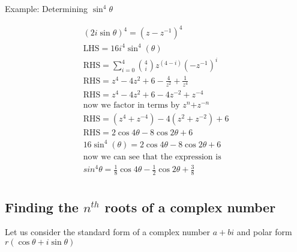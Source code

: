 Example: Determining $\sin^4{\theta}$

\begin{equation}
    \begin{split}
        (2i\sin{\theta})^4 = (z-z^{-1})^4 \\
        \text{LHS} = 16i^{4}\sin^4{(\theta)} \\         
        \text{RHS} = \sum _{i=0}^4\binom{4}{i}z^{\left(4-i\right)}\left(-z^{-1}\right)^i \\
        \text{RHS} = z^4-4z^2+6-\frac{4}{z^2}+\frac{1}{z^4} \\
        \text{RHS} = z^{4}-4z^{2}+6-4z^{-2}+z^{-4} \\
        \text{now we factor in terms by $z^n$+$z^{-n}$} \\ 
        \text{RHS} = (z^4+z^{-4})-4(z^2+z^{-2})+6 \\
        \text{RHS} = 2\cos{4\theta}-8\cos{2\theta}+6 \\
        16\sin^4{(\theta)} =  2\cos{4\theta}-8\cos{2\theta}+6  \\
        \text{now we can see that the expression is} \\
        sin^{4}\theta = \frac{1}{8}\cos{4\theta}-\frac{1}{2}\cos{2\theta}+\frac{3}{8}\\
    \end{split}
\end{equation}

\subsection{Finding the $n^{th}$ roots of a complex number}

Let us consider the standard form of a complex number $a+bi$ and polar form $r(\cos{\theta}+i\sin{\theta})$

